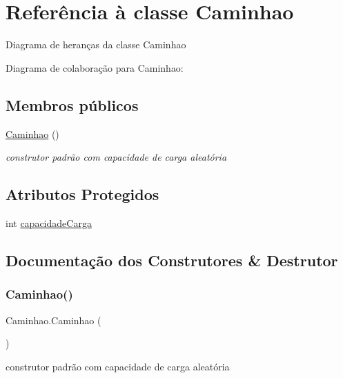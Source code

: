 \hypertarget{class_caminhao}{}\section{Referência à classe Caminhao}
\label{class_caminhao}


Diagrama de heranças da classe Caminhao


Diagrama de colaboração para Caminhao\+:
\subsection*{Membros públicos}
\begin{DoxyCompactItemize}
\item 
\mbox{\hyperlink{class_caminhao_af533c39b3db0b14e7c404d4d91a88e47}{Caminhao}} ()
\begin{DoxyCompactList}\small\item\em construtor padrão com capacidade de carga aleatória \end{DoxyCompactList}\end{DoxyCompactItemize}
\subsection*{Atributos Protegidos}
\begin{DoxyCompactItemize}
\item 
int \mbox{\hyperlink{class_caminhao_a32551c3ccafebc3d06ecb130e6c7cbb5}{capacidade\+Carga}}
\end{DoxyCompactItemize}


\subsection{Documentação dos Construtores \& Destrutor}
\mbox{\label{class_caminhao_af533c39b3db0b14e7c404d4d91a88e47}} 
\subsubsection{\texorpdfstring{Caminhao()}{Caminhao()}}
{\footnotesize\ttfamily Caminhao.\+Caminhao (\begin{DoxyParamCaption}{ }\end{DoxyParamCaption})}



construtor padrão com capacidade de carga aleatória 

